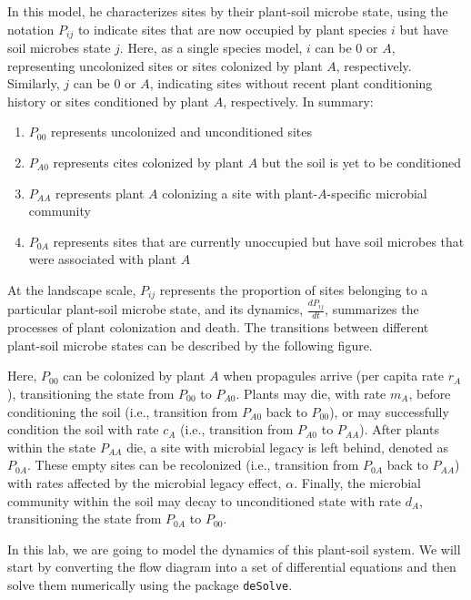 \documentclass[
]{book}
\providecommand{\tightlist}{%
  \setlength{\itemsep}{0pt}\setlength{\parskip}{0pt}}
\begin{document}
In this model, he characterizes sites by their plant-soil microbe state, using the notation \(P_{ij}\) to indicate sites that are now occupied by plant species \(i\) but have soil microbes state \(j\). Here, as a single species model, \(i\) can be 0 or \(A\), representing uncolonized sites or sites colonized by plant \(A\), respectively. Similarly, \(j\) can be 0 or \(A\), indicating sites without recent plant conditioning history or sites conditioned by plant \(A\), respectively. In summary:

\begin{enumerate}
\def\labelenumi{\arabic{enumi}.}
\tightlist
\item
  \(P_{00}\) represents uncolonized and unconditioned sites
\item
  \(P_{A0}\) represents cites colonized by plant \(A\) but the soil is yet to be conditioned
\item
  \(P_{AA}\) represents plant \(A\) colonizing a site with plant-\(A\)-specific microbial community
\item
  \(P_{0A}\) represents sites that are currently unoccupied but have soil microbes that were associated with plant \(A\)
\end{enumerate}

At the landscape scale, \(P_{ij}\) represents the proportion of sites belonging to a particular plant-soil microbe state, and its dynamics, \(\frac {dP_{ij}}{dt}\), summarizes the processes of plant colonization and death. The transitions between different plant-soil microbe states can be described by the following figure.

Here, \(P_{00}\) can be colonized by plant \(A\) when propagules arrive (per capita rate \(r_{A}\)), transitioning the state from \(P_{00}\) to \(P_{A0}\). Plants may die, with rate \(m_{A}\), before conditioning the soil (i.e., transition from \(P_{A0}\) back to \(P_{00}\)), or may successfully condition the soil with rate \(c_{A}\) (i.e., transition from \(P_{A0}\) to \(P_{AA}\)). After plants within the state \(P_{AA}\) die, a site with microbial legacy is left behind, denoted as \(P_{0A}\). These empty sites can be recolonized (i.e., transition from \(P_{0A}\) back to \(P_{AA}\)) with rates affected by the microbial legacy effect, \(\alpha\). Finally, the microbial community within the soil may decay to unconditioned state with rate \(d_{A}\), transitioning the state from \(P_{0A}\) to \(P_{00}\).

In this lab, we are going to model the dynamics of this plant-soil system. We will start by converting the flow diagram into a set of differential equations and then solve them numerically using the package \texttt{deSolve}.
\end{document}
